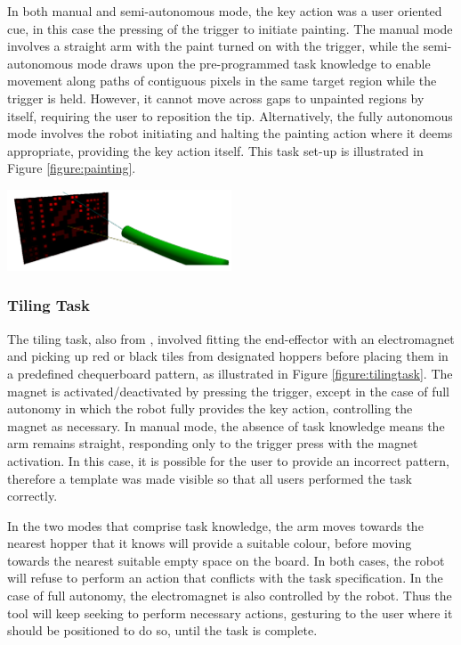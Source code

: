 \documentclass[11pt]{article}
\begin{document}
In both manual and semi-autonomous mode, the key action was a user oriented cue, in this case the pressing of the trigger to initiate painting. The manual mode involves a straight arm with the paint turned on with the trigger, while the semi-autonomous mode draws upon the pre-programmed task knowledge to enable movement along paths of contiguous pixels in the same target region while the trigger is held. However, it cannot move across gaps to unpainted regions by itself, requiring the user to reposition the tip. Alternatively, the fully autonomous mode involves the robot initiating and halting the painting action where it deems appropriate, providing the key action itself. This task set-up is illustrated in Figure \ref{figure:painting}.

\begin{center}
\includegraphics[width=0.5\textwidth]{painting.png}
\label{figure:painting}
\end{center}

\subsubsection{Tiling Task}
The tiling task, also from \cite{GreggSmithDesign}, involved fitting the end-effector with an electromagnet and picking up red or black tiles from designated hoppers before placing them in a predefined chequerboard pattern, as illustrated in Figure \ref{figure:tilingtask}. The magnet is activated/deactivated by pressing the trigger, except in the case of full autonomy in which the robot fully provides the key action, controlling the magnet as necessary. In manual mode, the absence of task knowledge means the arm remains straight, responding only to the trigger press with the magnet activation. In this case, it is possible for the user to provide an incorrect pattern, therefore a template was made visible so that all users performed the task correctly. 

In the two modes that comprise task knowledge, the arm moves towards the nearest hopper that it knows will provide a suitable colour, before moving towards the nearest suitable empty space on the board. In both cases, the robot will refuse to perform an action that conflicts with the task specification. In the case of full autonomy, the electromagnet is also controlled by the robot. Thus the tool will keep seeking to perform necessary actions, gesturing to the user where it should be positioned to do so, until the task is complete.
\end{document}
